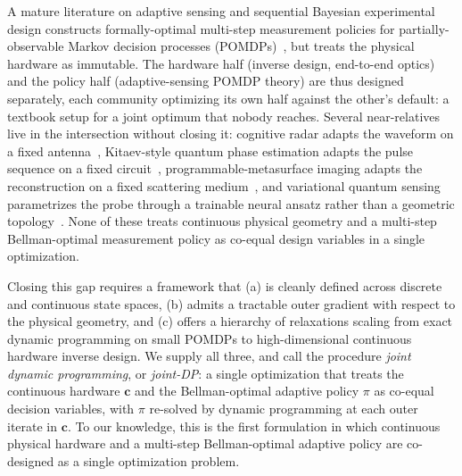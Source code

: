 \documentclass[11pt,a4paper,onecolumn]{article}
\newcommand{\bc}{\bm{c}}
\begin{document}
A mature literature on adaptive sensing and sequential Bayesian experimental design constructs formally-optimal multi-step measurement policies for partially-observable Markov decision processes (POMDPs)~\cite{kaelbling1998pomdp, smallwood1973sondik, sondik1971optimal, kreucher2005kastella, hero2011survey, castanon2008stochastic, chen2015adaptive, krause2005near, lindley1956measure, huan2016sequential, shen2023bayesian, alexanderian2021optimal, chaloner1995bayesian}, but treats the physical hardware as immutable.  The hardware half (inverse design, end-to-end optics) and the policy half (adaptive-sensing POMDP theory) are thus designed separately, each community optimizing its own half against the other's default: a textbook setup for a joint optimum that nobody reaches.  Several near-relatives live in the intersection without closing it: cognitive radar adapts the waveform on a fixed antenna~\cite{bell2015cognitive, haykin2006cognitive, greco2018cognitive, bouhou2025cognitive}, Kitaev-style quantum phase estimation adapts the pulse sequence on a fixed circuit~\cite{giovannetti2006quantum, braunstein1994sld, paris2009quantum, caves1981quantum, danilin2024scqubit, kitaev1995qpe, braverman2019slowing}, programmable-metasurface imaging adapts the reconstruction on a fixed scattering medium~\cite{yurduseven2017printed, imani2020review}, and variational quantum sensing parametrizes the probe through a trainable neural ansatz rather than a geometric topology~\cite{pirandola2018advances, degen2017sensing}.  None of these treats continuous physical geometry and a multi-step Bellman-optimal measurement policy as co-equal design variables in a single optimization.

Closing this gap requires a framework that (a) is cleanly defined across discrete and continuous state spaces, (b) admits a tractable outer gradient with respect to the physical geometry, and (c) offers a hierarchy of relaxations scaling from exact dynamic programming on small POMDPs to high-dimensional continuous hardware inverse design.  We supply all three, and call the procedure \emph{joint dynamic programming}, or \emph{joint-DP}: a single optimization that treats the continuous hardware $\bc$ and the Bellman-optimal adaptive policy $\pi$ as co-equal decision variables, with $\pi$ re-solved by dynamic programming at each outer iterate in $\bc$.  To our knowledge, this is the first formulation in which continuous physical hardware and a multi-step Bellman-optimal adaptive policy are co-designed as a single optimization problem.
\end{document}
